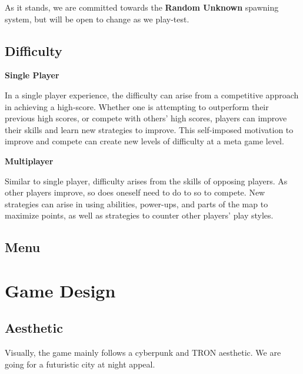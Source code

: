 \documentclass{article}
\theoremstyle{definition}
\begin{document}
As it stands, we are committed towards the \textbf{Random Unknown} spawning
system, but will be open to change as we play-test.

\subsection{Difficulty}

\textbf{Single Player}

In a single player experience, the difficulty can arise
from a competitive approach in achieving a high-score. Whether one is
attempting to outperform their previous high scores, or compete with others'
high scores, players can improve their skills and learn new strategies to
improve. This self-imposed motivation to improve and compete can create new
levels of difficulty at a meta game level.

\textbf{Multiplayer}

Similar to single player, difficulty arises from the skills of opposing
players. As other players improve, so does oneself need to do to so to compete.
New strategies can arise in using abilities, power-ups, and parts of the map to
maximize points, as well as strategies to counter other players' play styles.

\subsection{Menu}

\section{Game Design}

\subsection{Aesthetic}

Visually, the game mainly follows a cyberpunk and TRON aesthetic. We are going
for a futuristic city at night appeal.
\end{document}
